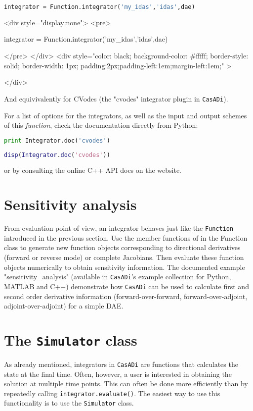 \documentclass[a4paper,12pt]{book}
\newcommand{\CasADi}{\texttt{CasADi}\xspace}
\newcounter{pytexcount}
\newcounter{pytexsubcount}
\renewenvironment{pytexoutput}
{\addtocounter{pytexsubcount}{1}%
\begin{rawhtml}
<div style="display:none">
<pre>
\end{rawhtml}
}%
{\begin{rawhtml}
</pre>
</div>
<div style="color: black; background-color: \#fffff;  border-style: solid; border-width: 1px; padding:2px;padding-left:1em;margin-left:1em;" >\end{rawhtml}%
\verbatiminputeval{pytex_\alph{pytexcount}_\arabic{pytexsubcount}.log}%
\begin{rawhtml}
</div>
\end{rawhtml}
}
\begin{document}
\begin{lstlisting}[language=Python]
integrator = Function.integrator('my_idas','idas',dae)
\end{lstlisting}
\begin{pytexoutput}
integrator = Function.integrator('my_idas','idas',dae)
\end{pytexoutput}

And equivivalently for CVodes (the "cvodes" integrator plugin in \CasADi).

For a list of options for the integrators, as well as the input and output schemes of this \emph{function}, check the documentation directly from Python:

\begin{minipage}[t]{0.5\textwidth}
\begin{lstlisting}[language=Python]
print Integrator.doc('cvodes')
\end{lstlisting}
\end{minipage}
\begin{minipage}[t]{0.5\textwidth}
\begin{lstlisting}[language=Matlab]
disp(Integrator.doc('cvodes'))
\end{lstlisting}
\end{minipage}

or by consulting the online C++ API docs on the website.

\section{Sensitivity analysis}
From evaluation point of view, an integrator behaves just like the \texttt{Function} introduced in the previous section. Use the member functions of in the Function class to generate new function objects corresponding to directional derivatives (forward or reverse mode) or complete Jacobians. Then evaluate these function objects numerically to obtain sensitivity information. The documented example "sensitivity\_analysis" (available in \CasADi's example collection for Python, MATLAB and C++) demonstrate how \CasADi can be used to calculate first and second order derivative information (forward-over-forward, forward-over-adjoint, adjoint-over-adjoint) for a simple DAE.

\section{The \texttt{Simulator} class}
As already mentioned, integrators in \CasADi are functions that calculates the state at the final time. Often, however, a user is interested in obtaining the solution at multiple time points. This can often be done more efficiently than by repeatedly calling \texttt{integrator.evaluate()}. The easiest way to use this functionality is to use the \texttt{Simulator} class.
\end{document}

